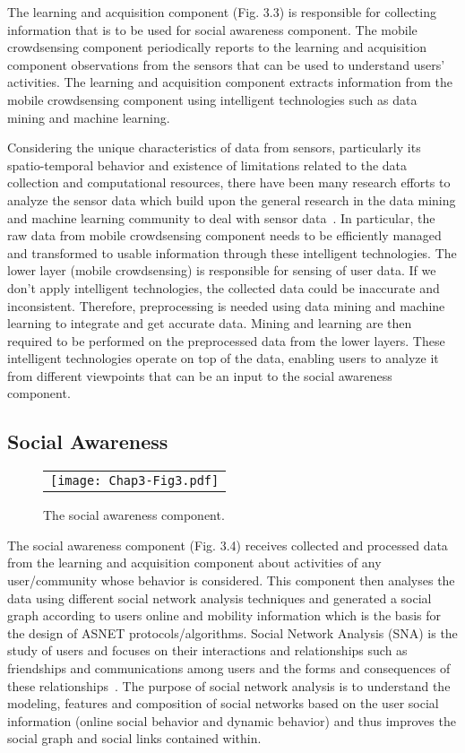 The learning and acquisition component (Fig. 3.3) is responsible for collecting information that is to be used for social awareness component. The mobile crowdsensing component periodically reports to the learning and acquisition component observations from the sensors that can be used to understand users' activities. The learning and acquisition component extracts information from the mobile crowdsensing component using intelligent technologies such as data mining and machine learning.

Considering the unique characteristics of data from sensors, particularly its spatio-temporal behavior and existence of limitations related to the data collection and computational resources, there have been many research efforts to analyze the sensor data which build upon the general research in the data mining and machine learning community to deal with sensor data~\cite{ZLi2011}. In particular, the raw data from mobile crowdsensing component needs to be efficiently managed and transformed to usable information through these intelligent technologies. The lower layer (mobile crowdsensing) is responsible for sensing of user data. If we don't apply intelligent technologies, the collected data could be inaccurate and inconsistent. Therefore, preprocessing is needed using data mining and machine learning to integrate and get accurate data. Mining and learning are then required to be performed on the preprocessed data from the lower layers. These intelligent technologies operate on top of the data, enabling users to analyze it from different viewpoints that can be an input to the social awareness component.

\subsection{Social Awareness}\label{Chap3_02_03}
\begin{figure}[t]
\begin{center}
  \begin{tabular}{c}
  \texttt{[image: Chap3-Fig3.pdf]}
  \end{tabular}
  \caption{The social awareness component.}
\end{center}
\end{figure}

The social awareness component (Fig. 3.4) receives collected and processed data from the learning and acquisition component about activities of any user/community whose behavior is considered. This component then analyses the data using different social network analysis techniques and generated a social graph according to users online and mobility information which is the basis for the design of ASNET protocols/algorithms. Social Network Analysis (SNA) is the study of users and focuses on their interactions and relationships such as friendships and communications among users and the forms and consequences of these relationships~\cite{SWasserman1995}. The purpose of social network analysis is to understand the modeling, features and composition of social networks based on the user social information (online social behavior and dynamic behavior) and thus improves the social graph and social links contained within.

